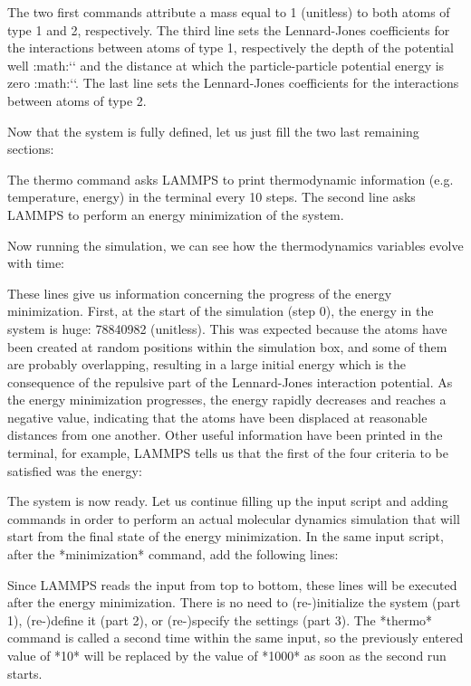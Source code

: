 The two first commands attribute a mass
equal to 1 (unitless) to both atoms of type 1 and 2,
respectively. The third line sets the Lennard-Jones
coefficients for the interactions between atoms of type 1,
respectively the depth of the potential well
:math:`\epsilon` and the distance at which the
particle-particle potential energy is zero :math:`\sigma`. 
The last line sets the Lennard-Jones coefficients for
the interactions between atoms of type 2.

Now that the system is fully defined, let us just fill the two last remaining sections:

The thermo command asks LAMMPS to print
thermodynamic information (e.g. temperature, energy) in the
terminal every 10 steps. The second line asks LAMMPS to
perform an energy minimization of the system.

Now running the simulation, we can see how the thermodynamics
variables evolve with time:

These lines give us information concerning
the progress of the energy minimization. First, at the start
of the simulation (step 0), the energy in the system is
huge: 78840982 (unitless). This was expected because
the atoms have been created at random positions within the
simulation box, and some of them are probably overlapping,
resulting in a large initial energy which is the consequence
of the repulsive part of the Lennard-Jones interaction
potential. As the energy minimization progresses, the energy
rapidly decreases and reaches a negative value, indicating that the atoms have been
displaced at reasonable distances from one another. Other
useful information have been printed in the terminal, for
example, LAMMPS tells us that the first of the four criteria
to be satisfied was the energy:

The system is now ready. Let us continue filling up the
input script and adding commands in order to perform an actual molecular dynamics
simulation that will start from the final state of the energy minimization.
In the same input script, after the *minimization* command, add the following
lines:

Since LAMMPS reads the input from top to
bottom, these lines will be executed after the energy
minimization. There is no need to (re-)initialize the system
(part 1), (re-)define it (part 2), or (re-)specify the settings
(part 3). The *thermo* command is called a second time within the 
same input, so the previously entered value of *10* will be replaced
by the value of *1000* as soon as the second run starts.

